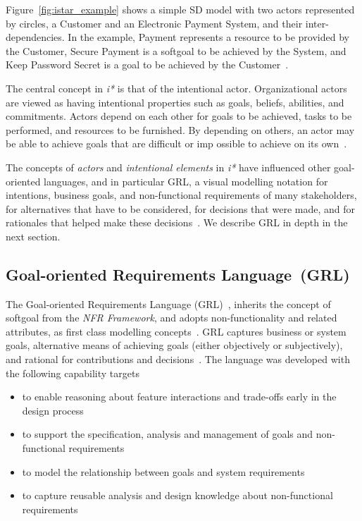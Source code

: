 \documentclass[dissertation,final]{softeng}
\begin{document}
Figure~\ref{fig:istar_example} shows a simple SD model with two actors represented by circles, a Customer and an Electronic Payment System, and their inter-dependencies. In the example, Payment represents a resource to be provided by the Customer, Secure Payment is a softgoal to be achieved by the System, and Keep Password Secret is a goal to be achieved by the Customer~\citep{Roy:2007wyba}.

The central concept in \emph{i*} is that of the intentional actor. Organizational actors are viewed as having intentional properties such as goals, beliefs, abilities, and commitments. Actors depend on each other for goals to be achieved, tasks to be performed, and resources to be furnished. By depending on others, an actor may be able to achieve goals that are difficult or imp 	ossible to achieve on its own~\citep{Yu1997}.

The concepts of \emph{actors} and \emph{intentional elements} in \emph{i*} have influenced other goal-oriented languages, and in particular GRL, a visual modelling notation for intentions, business goals, and non-functional requirements of many stakeholders, for alternatives that have to be considered, for decisions that were made, and for rationales that helped make these decisions~\citep{amyot2011user}. We describe GRL in depth in the next section.

\subsection{Goal-oriented Requirements Language~(GRL)}
\label{sec:gore}
The Goal-oriented Requirements Language (GRL)~\citep{Amyot2010}, inherits the concept of softgoal from the \emph{NFR Framework}, and adopts non-functionality and related attributes, as first class modelling concepts~\citep{Chung:2009vg}. GRL captures business or system goals, alternative means of achieving goals (either objectively or subjectively), and rational for contributions and decisions~\citep{Amyot2003}. The language was developed with the following capability targets~\citep{Amyot2003}

\begin{itemize}
\item to enable reasoning about feature interactions and trade-offs early in the design process
\item to support the specification, analysis and management of goals and non-functional requirements
\item to model the relationship between goals and system requirements
\item to capture reusable analysis and design knowledge about non-functional requirements
\end{itemize}
\end{document}
